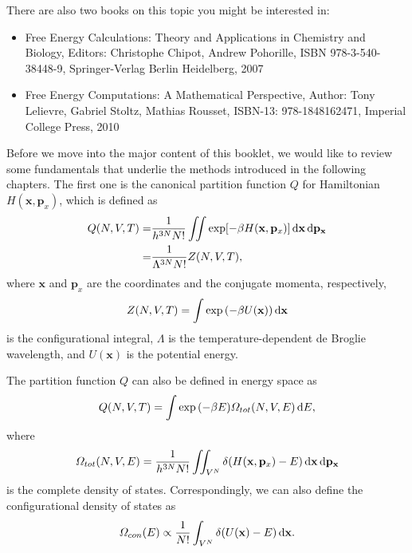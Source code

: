 There are also two books on this topic you might be interested in:
\begin{itemize}
\item Free Energy Calculations: Theory and Applications in Chemistry and Biology, Editors: Christophe Chipot, Andrew Pohorille, ISBN 978-3-540-38448-9, Springer-Verlag Berlin Heidelberg, 2007
\item Free Energy Computations: A Mathematical Perspective, Author: Tony Lelievre, Gabriel Stoltz, Mathias Rousset, ISBN-13: 978-1848162471, Imperial College Press, 2010
\end{itemize}

Before we move into the major content of this booklet, we would like to review some fundamentals that underlie the methods introduced in the following chapters. The first one is the canonical partition function $Q$ for Hamiltonian $H(\mathbf{x},\mathbf{p}_{x})$, which is defined as
\begin{align}
  Q(N,V,T)=&\frac{1}{{h}^{3N}N!} \iint \exp[-\beta H(\mathbf{x},\mathbf{p}_{x})] \mathop{}\!\mathrm{d}\mathbf{x}\mathop{}\!\mathrm{d}\mathbf{p}_\mathbf{x}\notag\\
         =&\frac{1}{\Lambda^{3N}N!}Z(N,V,T),
\end{align}
where $\mathbf{x}$ and $\mathbf{p}_{x}$ are the coordinates and the conjugate momenta, respectively,
\begin{equation}
	Z(N,V,T)=\int \exp{\left(-\beta U(\mathbf{x})\right)}\mathop{}\!\mathrm{d}\mathbf{x}
\end{equation}
is the configurational integral, $\Lambda$ is the temperature-dependent de Broglie wavelength, and $U(\mathbf{x})$ is the potential energy.

The partition function $Q$ can also be defined in energy space as
\begin{equation}
	Q(N,V,T)=\int \exp{\left(-\beta E\right)}\varOmega_{tot}(N,V,E)\mathop{}\!\mathrm{d} E,
\end{equation}
where
\begin{equation}
	\varOmega_{tot}(N,V,E)=\frac{1}{{h}^{3N}N!}\iint_{V^N} \delta(H(\mathbf{x},\mathbf{p}_{x})-E)\mathop{}\!\mathrm{d}\mathbf{x}\mathop{}\!\mathrm{d}\mathbf{p}_\mathbf{x}
\end{equation}
is the complete density of states. Correspondingly, we can also define the configurational density of states as
\begin{equation}
	\varOmega_{con}(E)\propto\frac{1}{N!}\int_{V^N} \delta(U(\mathbf{x})-E)\mathop{}\!\mathrm{d}\mathbf{x}.
\end{equation}

